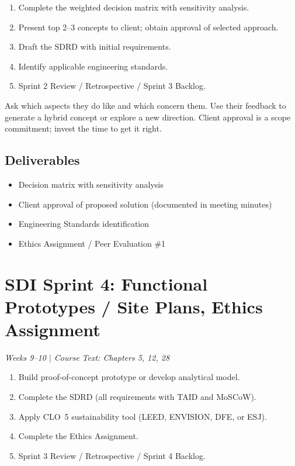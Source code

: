 \documentclass[11pt,letterpaper]{article}
\begin{document}
\begin{priorities}
\begin{enumerate}[nosep]
\item Complete the weighted decision matrix with sensitivity analysis.
\item Present top 2--3 concepts to client; obtain approval of selected approach.
\item Draft the SDRD with initial requirements.
\item Identify applicable engineering standards.
\item Sprint 2 Review / Retrospective / Sprint 3 Backlog.
\end{enumerate}
\end{priorities}

\begin{faqbox}
Ask which aspects they do like and which concern them. Use their feedback to generate a hybrid concept or explore a new direction. Client approval is a scope commitment; invest the time to get it right.
\end{faqbox}

\subsection{Deliverables}
\begin{itemize}[nosep,leftmargin=1.5em]
\item Decision matrix with sensitivity analysis
\item Client approval of proposed solution (documented in meeting minutes)
\item Engineering Standards identification
\item Ethics Assignment / Peer Evaluation \#1
\end{itemize}


\section{SDI Sprint 4: Functional Prototypes / Site Plans, Ethics Assignment}
\textit{Weeks 9--10 $|$ Course Text: Chapters 5, 12, 28}

\begin{priorities}
\begin{enumerate}[nosep]
\item Build proof-of-concept prototype or develop analytical model.
\item Complete the SDRD (all requirements with TAID and MoSCoW).
\item Apply CLO~5 sustainability tool (LEED, ENVISION, DFE, or ESJ).
\item Complete the Ethics Assignment.
\item Sprint 3 Review / Retrospective / Sprint 4 Backlog.
\end{enumerate}
\end{priorities}
\end{document}
